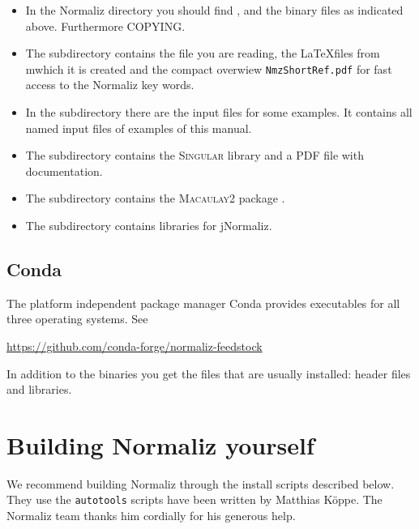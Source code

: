 \begin{itemize}
	\item In the Normaliz directory you should
	find , and the binary files as indicated above. Furthermore COPYING.
	
	\item The subdirectory  contains the file you are reading, the \LaTeX files from mwhich it is created and the compact overwiew \verb|NmzShortRef.pdf| for fast access to the Normaliz key words.
	
	\item In the subdirectory  there are the input
	files for some examples. It contains all named
	input files of examples of this manual.
	
	\item The subdirectory  contains the
	\textsc{Singular} library  and a PDF file with
	documentation.
	
	\item The subdirectory  contains the
	\textsc{Macaulay2} package .
	
	\item The subdirectory  contains libraries for
	jNormaliz.
\end{itemize}

\subsection{Conda}

The platform independent package manager Conda provides executables for all three operating systems. See
\begin{center}
	\url{https://github.com/conda-forge/normaliz-feedstock}
\end{center}
In addition to the binaries you get the files that are usually installed: header files and libraries.



\section{Building Normaliz yourself}\label{Compile}

We recommend building Normaliz through the install scripts described below. They use the \verb|autotools| scripts have been written by Matthias K\"oppe. The Normaliz team thanks him cordially for his generous help.

